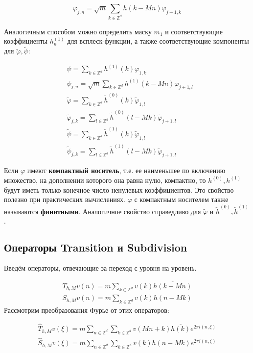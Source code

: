 \documentclass[a4paper,article,14pt]{extarticle}
\begin{document}
\[
	\varphi_{j,n} = \sqrt{m}\sum_{k \in \mathbb{Z}^d} h(k-Mn) \varphi_{j+1,k}
\]

Аналогичным способом можно определить маску $m_1$ и соответствующие коэффициенты $h_n^{(1)}$ для всплеск-функции, а также соответствующие компоненты для $\widetilde{\varphi}, \widetilde{\psi}$:

\[
	\begin{split}
	&\psi = \sum_{k \in \mathbb{Z}^d} h^{(1)}(k) \varphi_{1,k} \\
	&\psi_{j,n} = \sqrt{m}\sum_{k \in \mathbb{Z}^d} h^{(1)}(k-Mn) \varphi_{j+1,l} \\
	&\widetilde{\varphi}= \sum_{k \in \mathbb{Z}^d} \widetilde{h}^{(0)}(k) \widetilde{\varphi}_{1,l} \\
	&\widetilde{\varphi}_{j,k} = \sum_{l \in \mathbb{Z}^d} \widetilde{h}^{(0)} (l-Mk) \widetilde{\varphi}_{j+1,l} \\
	&\widetilde{\psi} = \sum_{k \in \mathbb{Z}^d} \widetilde{h}^{(1)} (k) \widetilde{\varphi}_{1,l} \\
	&\widetilde{\psi}_{j,k} = \sum_{l \in \mathbb{Z}^d} \widetilde{h}^{(1)} (l-Mk) \widetilde{\varphi}_{j+1,l}
\end{split}
\]

Если $\varphi$ имеют \textbf{компактный носитель}, т.е. ее наименьшее по включению множество, на дополнении которого она равна нулю, компактно, то $h^{(0)}, h^{(1)}$ будут иметь только конечное число ненулевых коэффициентов. Это свойство полезно при практических вычислениях. $\varphi$ с компактным носителем также называются \textbf{финитными}. Аналогичное свойство справедливо для $\widetilde{\varphi}$ и $\widetilde{h}^{(0)}, \widetilde{h}^{(1)}$.



\subsection{Операторы Transition и Subdivision}

Введём операторы, отвечающие за переход с уровня на уровень.

\[
	\begin{split}
		T_{h,M} v(n) = m \sum_{k \in \mathbb{Z}^d} v(k) \overline{h(k-Mn)} \\
		S_{h,M} v(n) = m \sum_{k \in \mathbb{Z}^d} v(k) h(n-Mk)
	\end{split}
\]
Рассмотрим преобразования Фурье от этих операторов:

\[
	\begin{split}
		\widehat{T}_{h,M} v(\xi) = m \sum_{n \in \mathbb{Z}^d} \sum_{k \in \mathbb{Z}^d} v(Mn+k) \overline{h(k)} e^{2 \pi i(n, \xi)} \\
		\widehat{S}_{h,M} v(\xi) = m \sum_{n \in \mathbb{Z}^d} \sum_{k \in \mathbb{Z}^d} v(k) h(n-Mk) e^{2 \pi i(n,\xi)}
	\end{split}
\]
\end{document}
